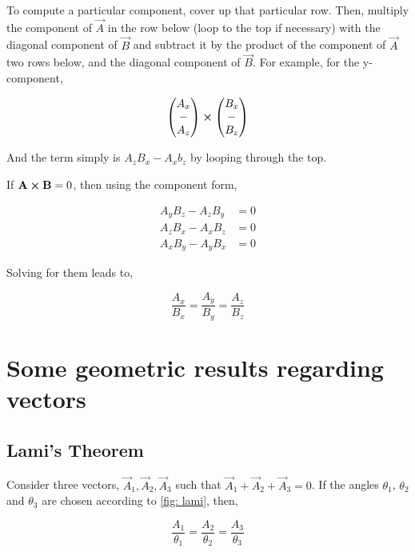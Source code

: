 To compute a particular component, cover up that particular row. Then, multiply the component 
of \(\vec{A}\) in the row below (loop to the top if necessary) 
with the diagonal component of \(\vec{B}\) and
subtract it by the product of the component of \(\vec{A}\) two rows below, and the
diagonal component of \(\vec{B}\). For example, for the y-component,

\[
\begin{pmatrix}
    A_x \\
    - \\
    A_z
\end{pmatrix} \cp
%
\begin{pmatrix}
    B_x \\
    - \\
    B_z
\end{pmatrix}
%
\]

And the term simply is \(A_zB_x - A_xb_z\) by looping through the top.

If \(\vec{A} \cp \vec{B} = 0\), then using the component form, 

\begin{align*}
        A_yB_z - A_zB_y &= 0\\
        A_zB_x - A_xB_z &= 0\\
        A_xB_y - A_yB_x &= 0
\end{align*}

Solving for them leads to,

\begin{equation*}
    \frac{A_x}{B_x} = \frac{A_y}{B_y} = \frac{A_z}{B_z}
\end{equation*}

\section{Some geometric results regarding vectors}

\subsection{Lami's Theorem}

Consider three vectors, \(\vec{A}_1, \vec{A}_2, \vec{A}_3\) such that 
\(\vec{A}_1 + \vec{A}_2 + \vec{A}_3 = 0\). If the angles \(\theta_1\), \(\theta_2\)
and \(\theta_3\) are chosen according to \cref{fig: lami}, then,

\begin{theorem}
    \begin{equation*}
        \frac{A_1}{\theta_1} = \frac{A_2}{\theta_2} = \frac{A_3}{\theta_3}
    \end{equation*}
\end{theorem}

